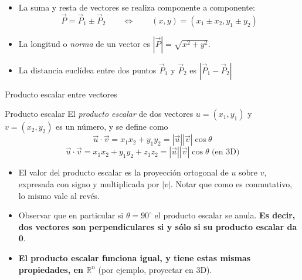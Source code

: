 \documentclass[compress]{beamer}
\newcommand{\be}{\begin{equation*}}
\newcommand{\ee}{\end{equation*}}
\begin{document}
\begin{frame}
\begin{itemize}
\item La suma y resta de vectores se realiza componente a componente:
    \be
    \vec{P} = \vec{P}_1 \pm \vec{P}_2  \qquad \Longleftrightarrow \qquad (x, y) = (x_1 \pm x_2, y_1 \pm y_2)
    \ee
    \vspace{0.25cm}
    \item La longitud o \emph{norma} de un vector es $|\vec{P}| = \sqrt{x^2 + y^2}$.
\vspace{0.25cm}
    \item La distancia eucl\'idea entre dos puntos $\vec{P}_1$ y $\vec{P}_2$ es $|\vec{P}_1 - \vec{P}_2|$
\end{itemize}
\end{frame}

\begin{frame}{Producto escalar entre vectores}

\begin{block}{Producto escalar}
El \emph{producto escalar} de dos vectores $u = (x_1,y_1)$ y $v = (x_2,y_2)$ es un n\'umero, y se define como
    \be
    \vec{u} \cdot \vec{v} = x_1 x_2 + y_1 y_2 = |\vec{u}| |\vec{v}| \cos\theta
    \ee
    \be
    \vec{u} \cdot \vec{v} = x_1 x_2 + y_1 y_2 + z_1 z_2 = |\vec{u}| |\vec{v}| \cos\theta \mbox{  (en 3D)}
    \ee
\end{block}
%
\begin{itemize}
    \item El valor del producto escalar es la proyección ortogonal de $u$ sobre $v$, expresada con signo y multiplicada por $|v|$. Notar que como es conmutativo, lo mismo vale al revés.
    \item Observar que en particular si $\theta = 90^\circ$ el producto escalar se anula.
    \textbf{Es decir, dos vectores son perpendiculares si y s\'olo si su producto escalar da 0}.

    \item \textbf{El producto escalar funciona igual, y tiene estas mismas propiedades, en $\mathbb{R}^n$} (por ejemplo, proyectar en 3D).
\end{itemize}

\end{frame}
\end{document}
